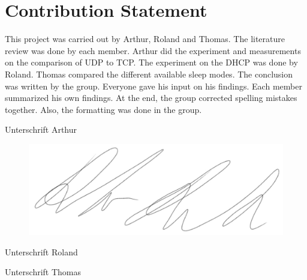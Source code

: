 \chapter*{Contribution Statement}
This project was carried out by Arthur, Roland and Thomas. The literature review was done by each member.
Arthur did the experiment and measurements on the comparison of UDP to TCP.
The experiment on the DHCP was done by Roland.
Thomas compared the different available sleep modes.
The conclusion was written by the group. Everyone gave his input on his findings.
Each member summarized his own findings. At the end, the group corrected spelling mistakes together. Also, the formatting was done in the group.

\vspace{2cm}

\begin{minipage}[t]{0.3\textwidth}
    Unterschrift Arthur
\end{minipage}
\begin{minipage}[t]{0.3\textwidth}
    \begin{figure}[H]
        \centering
        \includegraphics[width = 1 \linewidth]{./sign_roland.png}
        \label{fig:sign_roland}
    \end{figure}
    Unterschrift Roland
\end{minipage}
\begin{minipage}[t]{0.3\textwidth}
    Unterschrift Thomas
\end{minipage}